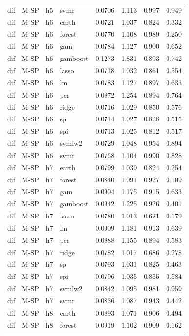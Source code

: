 \begin{ThreePartTable}
\begin{longtable}[t]{llclcccc}
dif & M-SP & h5 & svmr & 0.0706 & 1.113 & 0.997 & 0.949\\
\addlinespace
dif & M-SP & h6 & earth & 0.0721 & 1.037 & 0.824 & 0.332\\
dif & M-SP & h6 & forest & 0.0770 & 1.108 & 0.989 & 0.250\\
dif & M-SP & h6 & gam & 0.0784 & 1.127 & 0.900 & 0.652\\
dif & M-SP & h6 & gamboost & 0.1273 & 1.831 & 0.893 & 0.742\\
dif & M-SP & h6 & lasso & 0.0718 & 1.032 & 0.861 & 0.554\\
dif & M-SP & h6 & lm & 0.0783 & 1.127 & 0.897 & 0.633\\
dif & M-SP & h6 & pcr & 0.0872 & 1.254 & 0.894 & 0.764\\
dif & M-SP & h6 & ridge & 0.0716 & 1.029 & 0.850 & 0.576\\
dif & M-SP & h6 & sp & 0.0714 & 1.027 & 0.828 & 0.515\\
dif & M-SP & h6 & spi & 0.0713 & 1.025 & 0.812 & 0.517\\
dif & M-SP & h6 & svmlw2 & 0.0729 & 1.048 & 0.954 & 0.894\\
dif & M-SP & h6 & svmr & 0.0768 & 1.104 & 0.990 & 0.828\\
\addlinespace
dif & M-SP & h7 & earth & 0.0799 & 1.039 & 0.824 & 0.254\\
dif & M-SP & h7 & forest & 0.0840 & 1.091 & 0.927 & 0.109\\
dif & M-SP & h7 & gam & 0.0904 & 1.175 & 0.915 & 0.633\\
dif & M-SP & h7 & gamboost & 0.0942 & 1.225 & 0.926 & 0.401\\
dif & M-SP & h7 & lasso & 0.0780 & 1.013 & 0.621 & 0.179\\
dif & M-SP & h7 & lm & 0.0909 & 1.181 & 0.913 & 0.639\\
dif & M-SP & h7 & pcr & 0.0888 & 1.155 & 0.894 & 0.583\\
dif & M-SP & h7 & ridge & 0.0782 & 1.017 & 0.686 & 0.278\\
dif & M-SP & h7 & sp & 0.0793 & 1.031 & 0.825 & 0.463\\
dif & M-SP & h7 & spi & 0.0796 & 1.035 & 0.855 & 0.584\\
dif & M-SP & h7 & svmlw2 & 0.0842 & 1.095 & 0.981 & 0.959\\
dif & M-SP & h7 & svmr & 0.0836 & 1.087 & 0.943 & 0.442\\
\addlinespace
dif & M-SP & h8 & earth & 0.0893 & 1.071 & 0.906 & 0.494\\
dif & M-SP & h8 & forest & 0.0919 & 1.102 & 0.909 & 0.162\\

\end{longtable}
\end{ThreePartTable}

